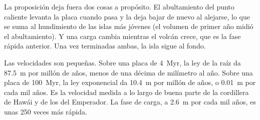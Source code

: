 La proposición deja fuera dos cosas a propósito. El abultamiento del punto caliente levanta la placa cuando
pasa y la deja bajar de nuevo al alejarse, lo que se suma al hundimiento de las islas más jóvenes
(el volumen de primer año midió el abultamiento). Y una carga cambia mientras el volcán crece, que es la
fase rápida anterior. Una vez terminadas ambas, la isla sigue al fondo.

Las velocidades son pequeñas. Sobre una placa de \qty{4}{Myr}, la ley de la raíz da \qty{87.5}{m} por millón
de años, menos de una décima de milímetro al año. Sobre una placa de \qty{100}{Myr}, la ley exponencial
da \qty{10.4}{m} por millón de años, o \qty{0.01}{m} por cada mil años. Es la velocidad
medida a lo largo de buena parte de la cordillera de Hawái y de los  del Emperador. La fase de carga, a
\qty{2.6}{m} por cada mil años, es unas 250 veces más rápida.

